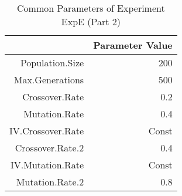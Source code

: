 \begin{table}[ht]
\centering
\begin{tabular}{rr}
  \hline
 & Parameter Value \\ 
  \hline
Population.Size & 200 \\ 
  Max.Generations & 500 \\ 
  Crossover.Rate & 0.2 \\ 
  Mutation.Rate & 0.4 \\ 
  IV.Crossover.Rate & Const \\ 
  Crossover.Rate.2 & 0.4 \\ 
  IV.Mutation.Rate & Const \\ 
  Mutation.Rate.2 & 0.8 \\ 
   \hline
\end{tabular}
\caption{Common Parameters of Experiment ExpE (Part 2)} 
\end{table}

